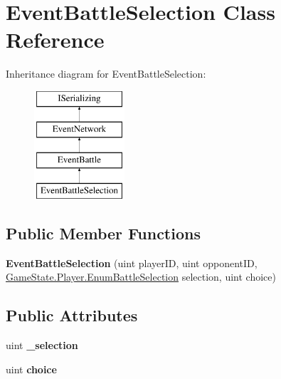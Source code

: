 \hypertarget{class_event_battle_selection}{\section{Event\-Battle\-Selection Class Reference}
\label{class_event_battle_selection}
}
Inheritance diagram for Event\-Battle\-Selection\-:\begin{figure}[H]
\begin{center}
\leavevmode
\includegraphics[height=4.000000cm]{class_event_battle_selection}
\end{center}
\end{figure}
\subsection*{Public Member Functions}
\begin{DoxyCompactItemize}
\item 
\hypertarget{class_event_battle_selection_a8cdfccc9d7b5e9bda4d9a62c31f509ca}{{\bfseries Event\-Battle\-Selection} (uint player\-I\-D, uint opponent\-I\-D, \hyperlink{class_game_state_1_1_player_a9f54c5eca1e60acbaa2074e981f51615}{Game\-State.\-Player.\-Enum\-Battle\-Selection} selection, uint choice)}\label{class_event_battle_selection_a8cdfccc9d7b5e9bda4d9a62c31f509ca}

\end{DoxyCompactItemize}
\subsection*{Public Attributes}
\begin{DoxyCompactItemize}
\item 
\hypertarget{class_event_battle_selection_a3f31e68cd024e74edbf0d8732d8d4cf6}{uint {\bfseries \-\_\-selection}}\label{class_event_battle_selection_a3f31e68cd024e74edbf0d8732d8d4cf6}

\item 
\hypertarget{class_event_battle_selection_afee34860cf0eab39082bc15a73d8e299}{uint {\bfseries choice}}\label{class_event_battle_selection_afee34860cf0eab39082bc15a73d8e299}

\end{DoxyCompactItemize}
